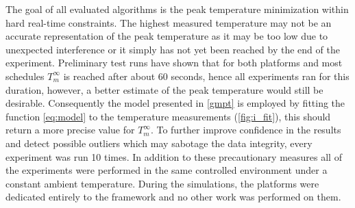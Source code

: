 The goal of all evaluated algorithms is the peak temperature minimization within hard real-time constraints. The highest measured temperature may not be an accurate representation of the peak temperature as it may be too low due to unexpected interference or it simply has not yet been reached by the end of the experiment. Preliminary test runs have shown that for both platforms and most schedules $T^\infty_m$ is reached after about 60 seconds, hence all experiments ran for this duration, however, a better estimate of the peak temperature would still be desirable. Consequently the model presented in \ref{gmpt} is employed by fitting the function \eqref{eq:model} to the temperature measurements (\autoref{fig:i_fit}), this should return a more precise value for $T^\infty_m$. To further improve confidence in the results and detect possible outliers which may sabotage the data integrity, every experiment was run 10 times. In addition to these precautionary measures all of the experiments were performed in the same controlled environment under a constant ambient temperature. During the simulations, the platforms were dedicated entirely to the framework and no other work was performed on them.
